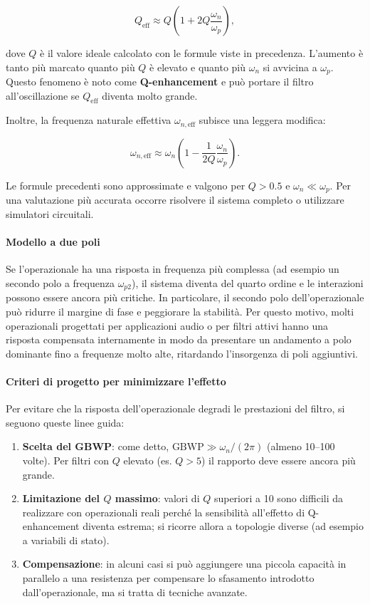 \begin{equation}
Q_{\text{eff}} \approx Q \left(1 + 2Q \frac{\omega_n}{\omega_p}\right),
\label{eq:Q_eff}
\end{equation}

dove \(Q\) è il valore ideale calcolato con le formule viste in precedenza. L'aumento è tanto più marcato quanto più \(Q\) è elevato e quanto più \(\omega_n\) si avvicina a \(\omega_p\). Questo fenomeno è noto come \textbf{Q-enhancement} e può portare il filtro all'oscillazione se \(Q_{\text{eff}}\) diventa molto grande.

Inoltre, la frequenza naturale effettiva \(\omega_{n,\text{eff}}\) subisce una leggera modifica:

\begin{equation}
\omega_{n,\text{eff}} \approx \omega_n \left(1 - \frac{1}{2Q} \frac{\omega_n}{\omega_p} \right).
\label{eq:wn_eff}
\end{equation}

Le formule precedenti sono approssimate e valgono per \(Q > 0.5\) e \(\omega_n \ll \omega_p\). Per una valutazione più accurata occorre risolvere il sistema completo o utilizzare simulatori circuitali.

\paragraph{Modello a due poli}
Se l'operazionale ha una risposta in frequenza più complessa (ad esempio un secondo polo a frequenza \(\omega_{p2}\)), il sistema diventa del quarto ordine e le interazioni possono essere ancora più critiche. In particolare, il secondo polo dell'operazionale può ridurre il margine di fase e peggiorare la stabilità. Per questo motivo, molti operazionali progettati per applicazioni audio o per filtri attivi hanno una risposta compensata internamente in modo da presentare un andamento a polo dominante fino a frequenze molto alte, ritardando l'insorgenza di poli aggiuntivi.

\paragraph{Criteri di progetto per minimizzare l'effetto}
Per evitare che la risposta dell'operazionale degradi le prestazioni del filtro, si seguono queste linee guida:
\begin{enumerate}
    \item \textbf{Scelta del GBWP}: come detto, \(\text{GBWP} \gg \omega_n/(2\pi)\) (almeno 10–100 volte). Per filtri con \(Q\) elevato (es. \(Q>5\)) il rapporto deve essere ancora più grande.
    \item \textbf{Limitazione del \(Q\) massimo}: valori di \(Q\) superiori a 10 sono difficili da realizzare con operazionali reali perché la sensibilità all'effetto di Q-enhancement diventa estrema; si ricorre allora a topologie diverse (ad esempio a variabili di stato).
    \item \textbf{Compensazione}: in alcuni casi si può aggiungere una piccola capacità in parallelo a una resistenza per compensare lo sfasamento introdotto dall'operazionale, ma si tratta di tecniche avanzate.
\end{enumerate}

